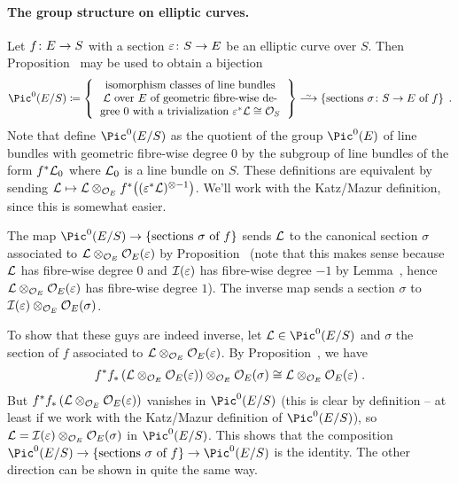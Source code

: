 \documentclass[a4paper,parskip=half,numbers=enddot, DIV=12]{scrreprt}
\begin{document}
	\paragraph{The group structure on elliptic curves.}Let $f\colon E\morphism S$ with a section $\epsilon\colon S\morphism E$ be an elliptic curve over $S$. Then Proposition~ may be used to obtain a bijection
	\begin{align*}
		\Pic^0(E/S)\coloneqq\left\{\begin{tabular}{c}
			isomorphism classes of line bundles\\
			$\Ll$ over $E$ of geometric fibre-wise de-\\
			gree 0 with a trivialization $\epsilon^*\Ll\cong\Oo_S$
		\end{tabular}\right\}\isomorphism\left\{\text{sections }\sigma\colon S\to E\text{ of }f\right\}\;.
	\end{align*}
	Note that \cite[pp.~63--67]{katzmazur} define $\Pic^0(E/S)$ as the quotient of the group $\Pic^0(E)$ of line bundles with geometric fibre-wise degree $0$ by the subgroup of line bundles of the form $f^*\mathcal{L}_0$ where $\mathcal{L}_0$ is a line bundle on $S$. These definitions are equivalent by sending $\mathcal{L}\mapsto \mathcal{L}\otimes_{\mathcal{O}_E}f^*\big((\varepsilon^*\mathcal{L})^{\otimes -1}\big)$. We'll work with the Katz/Mazur definition, since this is somewhat easier.
	
	The map $\Pic^0(E/S)\morphism\{\text{sections }\sigma\text{ of }f\}$ sends $\mathcal{L}$ to the canonical section $\sigma$ associated to $\mathcal{L}\otimes_{\mathcal{O}_E}\mathcal{O}_E(\varepsilon)$ by Proposition~ (note that this makes sense because $\mathcal{L}$ has fibre-wise degree $0$ and $\mathcal{I}(\varepsilon)$ has fibre-wise degree $-1$ by Lemma~, hence $\mathcal{L}\otimes_{\mathcal{O}_E}\mathcal{O}_E(\varepsilon)$ has fibre-wise degree $1$). The inverse map sends a section $\sigma$ to $\mathcal{I}(\varepsilon)\otimes_{\mathcal{O}_E}\mathcal{O}_E(\sigma)$.
	
	To show that these guys are indeed inverse, let $\Ll\in\Pic^0(E/S)$ and $\sigma$ the section of $f$ associated to $\mathcal{L}\otimes_{\mathcal{O}_E}\mathcal{O}_E(\varepsilon)$. By Proposition~, we have
	\begin{align*}
		f^*f_*\left(\mathcal{L}\otimes_{\mathcal{O}_E}\mathcal{O}_E(\varepsilon)\right)\otimes_{\mathcal{O}_E}\mathcal{O}_E(\sigma)\cong\mathcal{L}\otimes_{\mathcal{O}_E}\mathcal{O}_E(\varepsilon)\;.
	\end{align*}
	But $f^*f_*\left(\mathcal{L}\otimes_{\mathcal{O}_E}\mathcal{O}_E(\varepsilon)\right)$ vanishes in $\Pic^0(E/S)$ (this is clear by definition -- at least if we work with the Katz/Mazur definition of $\Pic^0(E/S)$), so $\mathcal{L}=\mathcal{I}(\varepsilon)\otimes_{\mathcal{O}_E}\mathcal{O}_E(\sigma)$ in $\Pic^0(E/S)$. This shows that the composition $\Pic^0(E/S)\morphism\{\text{sections }\sigma\text{ of }f\}\morphism\Pic^0(E/S)$ is the identity. The other direction can be shown in quite the same way.
	
\end{document}
